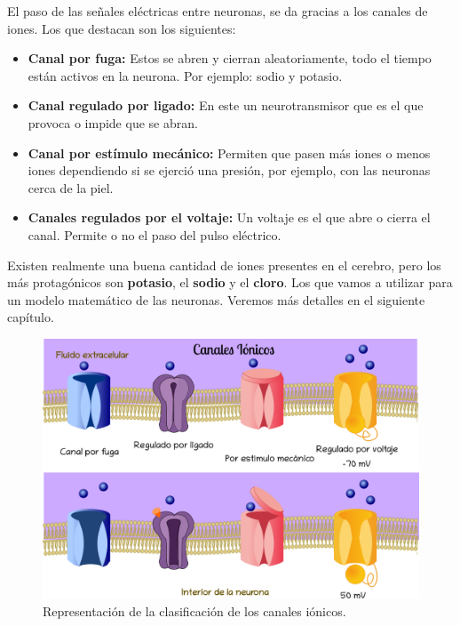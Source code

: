 El paso de las señales eléctricas entre neuronas, se da gracias a los canales de iones. Los que destacan son los siguientes:

\begin{itemize}
\item \textbf{Canal por fuga:} Estos se abren y cierran aleatoriamente, todo el tiempo están activos en la neurona. Por ejemplo: sodio y potasio.

\item \textbf{Canal regulado por ligado:} En este un neurotransmisor que es el que provoca o impide que se abran. 

\item  \textbf{Canal por estímulo mecánico:} Permiten que pasen más iones o menos iones dependiendo si se ejerció una presión, por ejemplo, con las neuronas cerca de la piel.
\item \textbf{Canales regulados por el voltaje:} Un voltaje es el que abre o cierra el canal. Permite o no el paso del pulso eléctrico. %
\end{itemize}


Existen realmente una buena cantidad de iones presentes en el cerebro, pero los más protagónicos son \textbf{potasio}, el \textbf{sodio} y el \textbf{cloro}. Los que vamos a utilizar para un modelo matemático de las neuronas. Veremos más detalles en el siguiente capítulo.


\begin{figure}[h]
 \centering
 \includegraphics[scale=0.28]{../Figuras/canalesIonicos.png}
 \caption{Representación de la clasificación de los canales iónicos.}
 \label{fig:MembranaP}
\end{figure}



